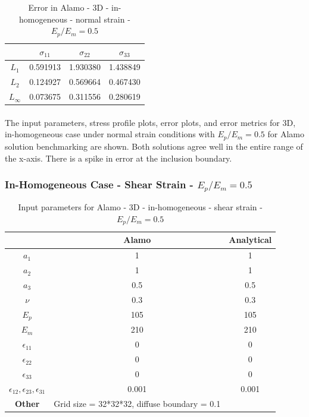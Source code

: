 \documentclass[12pt, a4paper]{report}
\begin{document}
\begin{table}[H]
    \centering
    \begin{tabular}{|c|c|c|c|}
        \hline
        &\textbf{$\sigma_{11}$} &  \textbf{$\sigma_{22}$} & \textbf{$\sigma_{33}$}\\
        \hline
        $L_1$ & 0.591913 & 1.930380 & 1.438849 \\
        \hline
        $L_2$ & 0.124927 & 0.569664 & 0.467430 \\
        \hline 
        $L_\infty$ & 0.073675 & 0.311556 & 0.280619 \\
        \hline
    \end{tabular}
    \caption{Error in Alamo - 3D - in-homogeneous - normal strain - $E_p/E_m = 0.5$}
\end{table}

\paragraph{}
The input parameters, stress profile plots, error plots, and error metrics for 3D, in-homogeneous case under normal strain conditions with $E_p/E_m = 0.5$ for Alamo solution benchmarking are shown. Both solutions agree well in the entire range of the x-axis. There is a spike in error at the inclusion boundary.

\newpage

\subsubsection{In-Homogeneous Case - Shear Strain - $E_p/E_m = 0.5$}
\begin{table}[H]
    \centering
    \begin{tabular}{|c|c|c|}
        \hline
        & \textbf{Alamo} &\textbf{Analytical}\\
        \hline
        \textbf{$a_1$} & 1 & 1 \\
        \hline
        \textbf{$a_2$} & 1 & 1 \\
        \hline
        \textbf{$a_3$} & 0.5 & 0.5 \\
        \hline
        \textbf{$\nu$} & 0.3 & 0.3 \\
        \hline
        \textbf{$E_p$} & 105 & 105 \\
        \hline
        \textbf{$E_m$} & 210 & 210 \\
        \hline
        \textbf{$\epsilon_{11}$} & 0 & 0 \\
        \hline
        \textbf{$\epsilon_{22}$} & 0 & 0 \\
        \hline
        \textbf{$\epsilon_{33}$} & 0 & 0 \\
        \hline
        \textbf{$\epsilon_{12}, \epsilon_{23}, \epsilon_{31}$} & 0.001 & 0.001 \\
        \hline
        \textbf{Other} & Grid size = 32*32*32, diffuse boundary = 0.1 &  \\
        \hline
    \end{tabular}
    \caption{Input parameters for Alamo - 3D - in-homogeneous - shear strain - $E_p/E_m = 0.5$}
\end{table}
\end{document}
